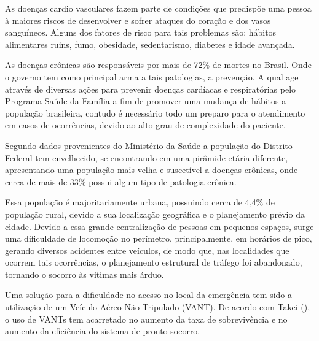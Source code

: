 As doenças cardio vasculares fazem parte de condições que predispõe uma pessoa à maiores riscos de 
desenvolver e sofrer ataques do coração e dos vasos sanguíneos. Alguns dos fatores de risco para tais problemas são: 
hábitos alimentares ruins, fumo, obesidade, sedentarismo, diabetes e idade avançada. \cite{ceolin}

As doenças crônicas são responsáveis por mais de 72\% de mortes no Brasil. Onde o governo tem como principal arma a tais patologias, 
a prevenção. A qual age através de diversas ações para prevenir doenças cardíacas e respiratórias pelo Programa Saúde da Família a fim de promover
uma mudança de hábitos a população brasileira, contudo é necessário todo um preparo para o atendimento em casos de ocorrências, devido ao alto grau de 
complexidade do paciente. \cite{portal}

Segundo dados provenientes do Ministério da Saúde a população do Distrito Federal tem envelhecido, se encontrando em uma pirâmide etária diferente, 
apresentando uma população mais velha e suscetível a doenças crônicas, onde cerca de mais de 33\% possui algum tipo de patologia crônica. \cite{portal}

Essa população é majoritariamente urbana, possuindo cerca de 4,4\% de população rural, devido a sua localização geográfica e o planejamento prévio da cidade. 
Devido a essa grande centralização de pessoas em pequenos espaços, surge uma dificuldade de locomoção no perímetro, principalmente, em horários de pico, 
gerando diversos acidentes entre veículos, de modo que, nas localidades que ocorrem tais ocorrências, o planejamento estrutural de tráfego foi abandonado, 
tornando o socorro às vitimas mais árduo. \cite{oliveira}

Uma solução para a dificuldade no acesso no local da emergência tem sido a utilização de um Veículo Aéreo Não Tripulado (VANT). 
De acordo com Takei (\citeyear{DEE}), o uso de VANTs tem acarretado no aumento da taxa de sobrevivência e no aumento da eficiência do sistema de pronto-socorro.
